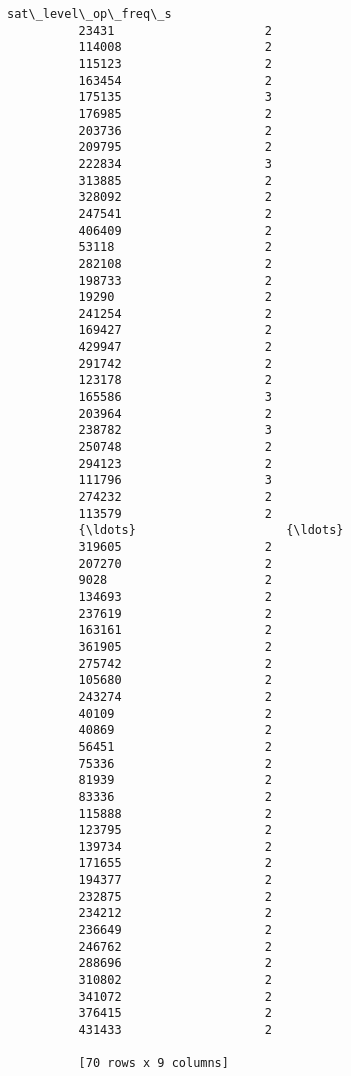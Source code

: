 \documentclass[11pt]{article}
\begin{document}
\begin{Verbatim}[commandchars=\\\{\}]
                  sat\_level\_op\_freq\_s  
          23431                     2  
          114008                    2  
          115123                    2  
          163454                    2  
          175135                    3  
          176985                    2  
          203736                    2  
          209795                    2  
          222834                    3  
          313885                    2  
          328092                    2  
          247541                    2  
          406409                    2  
          53118                     2  
          282108                    2  
          198733                    2  
          19290                     2  
          241254                    2  
          169427                    2  
          429947                    2  
          291742                    2  
          123178                    2  
          165586                    3  
          203964                    2  
          238782                    3  
          250748                    2  
          294123                    2  
          111796                    3  
          274232                    2  
          113579                    2  
          {\ldots}                     {\ldots}  
          319605                    2  
          207270                    2  
          9028                      2  
          134693                    2  
          237619                    2  
          163161                    2  
          361905                    2  
          275742                    2  
          105680                    2  
          243274                    2  
          40109                     2  
          40869                     2  
          56451                     2  
          75336                     2  
          81939                     2  
          83336                     2  
          115888                    2  
          123795                    2  
          139734                    2  
          171655                    2  
          194377                    2  
          232875                    2  
          234212                    2  
          236649                    2  
          246762                    2  
          288696                    2  
          310802                    2  
          341072                    2  
          376415                    2  
          431433                    2  
          
          [70 rows x 9 columns]
\end{Verbatim}
            
\end{document}
